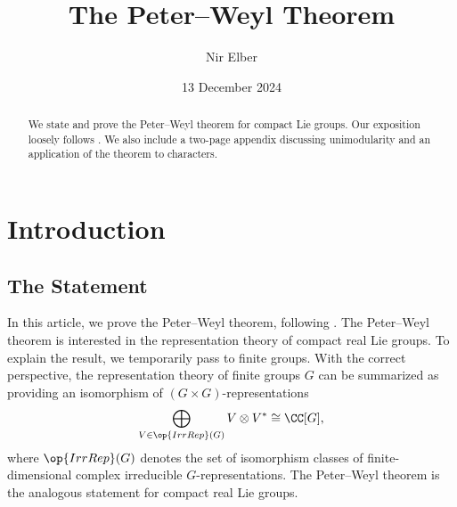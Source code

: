 \documentclass{amsart}
\title{The Peter--Weyl Theorem}
\author{Nir Elber}
\date{13 December 2024}
\begin{document}
\begin{abstract}
	\noindent We state and prove the Peter--Weyl theorem for compact Lie groups. Our exposition loosely follows \cite[Sections~34--36]{etingof-lie-theory}. We also include a two-page appendix discussing unimodularity and an application of the theorem to characters.
\end{abstract}

\maketitle

\setcounter{tocdepth}{2}
\tableofcontents

\section{Introduction}

\subsection{The Statement}
In this article, we prove the Peter--Weyl theorem, following \cite[Sections~34--36]{etingof-lie-theory}. The Peter--Weyl theorem is interested in the representation theory of compact real Lie groups. To explain the result, we temporarily pass to finite groups. With the correct perspective, the representation theory of finite groups $G$ can be summarized as providing an isomorphism of $(G\times G)$-representations
\[\bigoplus_{V\in\op{IrrRep}(G)}V\otimes V^*\cong\CC[G],\]
where $\op{IrrRep}(G)$ denotes the set of isomorphism classes of finite-dimensional complex irreducible $G$-represen\-tations. The Peter--Weyl theorem is the analogous statement for compact real Lie groups.
\end{document}
